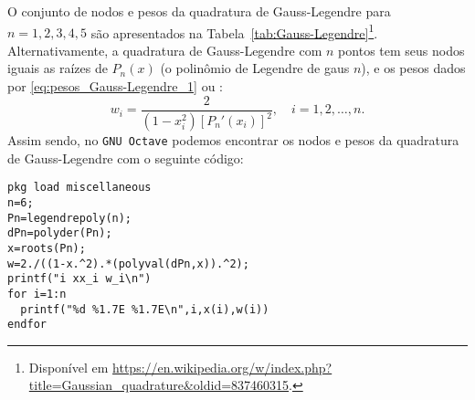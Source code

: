 \begin{obs}\label{obs:quad_Gauss-Legendre}
  O conjunto de nodos e pesos da quadratura de Gauss-Legendre para $n=1, 2, 3, 4, 5$ são apresentados na Tabela~\ref{tab:Gauss-Legendre}\footnote{Disponível em \url{https://en.wikipedia.org/w/index.php?title=Gaussian_quadrature&oldid=837460315}.}. Alternativamente, a quadratura de Gauss-Legendre com $n$ pontos tem seus nodos iguais as raízes de $P_n(x)$ (o polinômio de Legendre de gaus $n$), e os pesos dados por \eqref{eq:pesos_Gauss-Legendre_1} ou \cite[Cap.4, Sec. 4.6]{Press2007a}:
  \begin{equation}
    w_i = \frac{2}{(1-x_i^2)\left[P_n'(x_i)\right]^2},\quad i=1, 2, \dotsc, n.
  \end{equation}
\ifisoctave
Assim sendo, no \verb+GNU Octave+ podemos encontrar os nodos e pesos da quadratura de Gauss-Legendre com o seguinte código:
\begin{verbatim}
pkg load miscellaneous
n=6;
Pn=legendrepoly(n);
dPn=polyder(Pn);
x=roots(Pn);
w=2./((1-x.^2).*(polyval(dPn,x)).^2);
printf("i xx_i w_i\n")
for i=1:n
  printf("%d %1.7E %1.7E\n",i,x(i),w(i))
endfor
\end{verbatim}
\fi
\end{obs}

